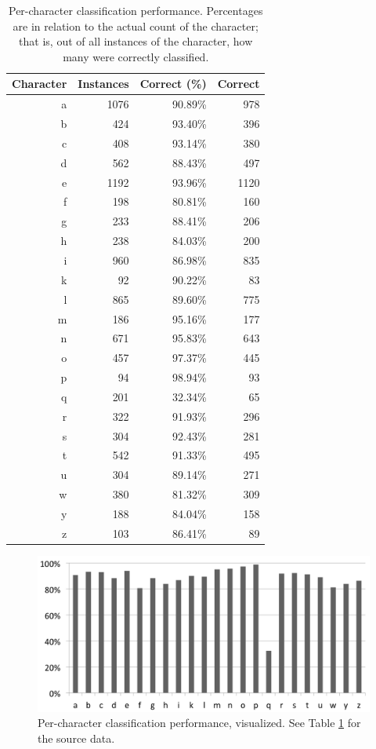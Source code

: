 \documentclass{netsec2012}
\begin{document}
\begin{table}[t]
\centering
\begin{tabular}{|r|r|r|r|}
\hline
Character & Instances & Correct (\%) & Correct \\
\hline
a &   1076 &    90.89\% &    978 \\
b &    424 &    93.40\% &    396 \\
c &    408 &    93.14\% &    380 \\
d &    562 &    88.43\% &    497 \\
e &   1192 &    93.96\% &    1120 \\
f &    198 &    80.81\% &    160 \\
g &    233 &    88.41\% &    206 \\
h &    238 &    84.03\% &    200 \\
i &    960 &    86.98\% &    835 \\
k &     92 &    90.22\% &    83 \\
l &    865 &    89.60\% &    775 \\
m &    186 &    95.16\% &    177 \\
n &    671 &    95.83\% &    643 \\
o &    457 &    97.37\% &    445 \\
p &     94 &    98.94\% &    93 \\
q &    201 &    32.34\% &    65 \\
r &    322 &    91.93\% &    296 \\
s &    304 &    92.43\% &    281 \\
t &    542 &    91.33\% &    495 \\
u &    304 &    89.14\% &    271 \\
w &    380 &    81.32\% &    309 \\
y &    188 &    84.04\% &    158 \\
z &    103 &    86.41\% &    89 \\
\hline
\end{tabular}
\caption{Per-character classification performance.  Percentages are in relation to the actual count
of the character; that is, out of all instances of the character, how many were correctly
classified.}
\label{tab:percharperformance}
\end{table}

\begin{figure}[t]
\centering
\includegraphics[width=120mm]{percharperf.png}
\caption{Per-character classification performance, visualized.  See Table
    \ref{tab:percharperformance} for the source data.}
\label{fig:percharperformance}
\end{figure}
\end{document}
